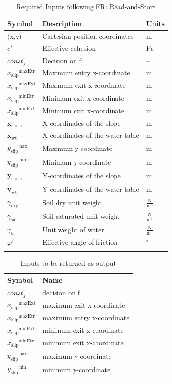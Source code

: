\documentclass[12pt]{article}
\begin{document}
\begin{longtable}{l l l}
\toprule
\textbf{Symbol} & \textbf{Description} & \textbf{Units}
\\
\midrule
\endhead
$\text{(x,y)}$ & Cartesian position coordinates & m
\\
$c'$ & Effective cohesion & Pa
\\
$const_f$ & Decision on f & --
\\
${{x_{\text{slip}}}^{\text{maxEtr}}}$ & Maximum entry x-coordinate & m
\\
${{x_{\text{slip}}}^{\text{maxExt}}}$ & Maximum exit x-coordinate & m
\\
${{x_{\text{slip}}}^{\text{minEtr}}}$ & Minimum exit x-coordinate & m
\\
${{x_{\text{slip}}}^{\text{minExt}}}$ & Minimum exit x-coordinate & m
\\
${\mathbf{x}_{\text{slope}}}$ & X-coordinates of the slope & m
\\
${\mathbf{x}_{\text{wt}}}$ & X-coordinates of the water table & m
\\
${{y_{\text{slip}}}^{\text{max}}}$ & Maximum y-coordinate & m
\\
${{y_{\text{slip}}}^{\text{min}}}$ & Minimum y-coordinate & m
\\
${\mathbf{y}_{\text{slope}}}$ & Y-coordinates of the slope & m
\\
${\mathbf{y}_{\text{wt}}}$ & Y-coordinates of the water table & m
\\
${γ_{\text{dry}}}$ & Soil dry unit weight & $\frac{\text{N}}{\text{m}^{3}}$
\\
${γ_{\text{sat}}}$ & Soil saturated unit weight & $\frac{\text{N}}{\text{m}^{3}}$
\\
${γ_{w}}$ & Unit weight of water & $\frac{\text{N}}{\text{m}^{3}}$
\\
$φ'$ & Effective angle of friction & ${}^{\circ}$
\\
\bottomrule
\caption{Required Inputs following \hyperref[readAndStore]{FR: Read-and-Store}}
\label{Table:ReqInputs}
\end{longtable}
\begin{longtable}{l l}
\toprule
\textbf{Symbol} & \textbf{Name}
\\
\midrule
\endhead
$const_f$ & decision on f
\\
${{x_{\text{slip}}}^{\text{maxExt}}}$ & maximum exit x-coordinate
\\
${{x_{\text{slip}}}^{\text{maxEtr}}}$ & maximum entry x-coordinate
\\
${{x_{\text{slip}}}^{\text{minExt}}}$ & minimum exit x-coordinate
\\
${{x_{\text{slip}}}^{\text{minEtr}}}$ & minimum exit x-coordinate
\\
${{y_{\text{slip}}}^{\text{max}}}$ & maximum y-coordinate
\\
${{y_{\text{slip}}}^{\text{min}}}$ & minimum y-coordinate
\\
\bottomrule
\caption{Inputs to be returned as output}
\label{Table:inputsToOutputTable}
\end{longtable}
\end{document}
